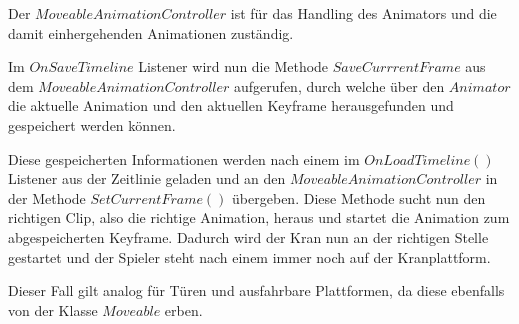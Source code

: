 Der $MoveableAnimationController$ ist für das Handling des Animators und die damit einhergehenden Animationen zuständig.

Im $OnSaveTimeline$ Listener wird nun die Methode $SaveCurrrentFrame$ aus dem $MoveableAnimationController$ aufgerufen, durch welche über den $Animator$ die aktuelle Animation und den aktuellen Keyframe herausgefunden und gespeichert werden können.

Diese gespeicherten Informationen werden nach einem  im $OnLoadTimeline()$ Listener aus der Zeitlinie geladen und an den $MoveableAnimationController$ in der Methode $SetCurrentFrame()$ übergeben. Diese Methode sucht nun den richtigen Clip, also die richtige Animation, heraus und startet die Animation zum abgespeicherten Keyframe.
Dadurch wird der Kran nun an der richtigen Stelle gestartet und der Spieler steht nach einem  immer noch auf der Kranplattform.

Dieser Fall gilt analog für Türen und ausfahrbare Plattformen, da diese ebenfalls von der Klasse $Moveable$ erben.

